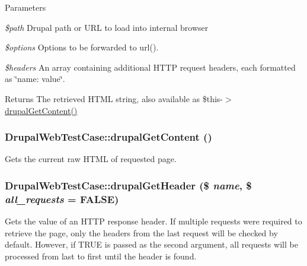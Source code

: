 \begin{DoxyParams}{Parameters}
\item[{\em \$path}]Drupal path or URL to load into internal browser \item[{\em \$options}]Options to be forwarded to url(). \item[{\em \$headers}]An array containing additional HTTP request headers, each formatted as \char`\"{}name: value\char`\"{}. \end{DoxyParams}
\begin{DoxyReturn}{Returns}
The retrieved HTML string, also available as \$this-\/$>$\hyperlink{class_drupal_web_test_case_a65cc4334da96452d127a9fb50636e7bb}{drupalGetContent()} 
\end{DoxyReturn}
\hypertarget{class_drupal_web_test_case_a65cc4334da96452d127a9fb50636e7bb}{
\subsubsection[{drupalGetContent}]{\setlength{\rightskip}{0pt plus 5cm}DrupalWebTestCase::drupalGetContent ()}}
\label{class_drupal_web_test_case_a65cc4334da96452d127a9fb50636e7bb}
Gets the current raw HTML of requested page. \hypertarget{class_drupal_web_test_case_a2a5d661d1f61cf9ac2c8bb5969d5d373}{
\subsubsection[{drupalGetHeader}]{\setlength{\rightskip}{0pt plus 5cm}DrupalWebTestCase::drupalGetHeader (\$ {\em name}, \/  \$ {\em all\_\-requests} = {\ttfamily FALSE})}}
\label{class_drupal_web_test_case_a2a5d661d1f61cf9ac2c8bb5969d5d373}
Gets the value of an HTTP response header. If multiple requests were required to retrieve the page, only the headers from the last request will be checked by default. However, if TRUE is passed as the second argument, all requests will be processed from last to first until the header is found.


